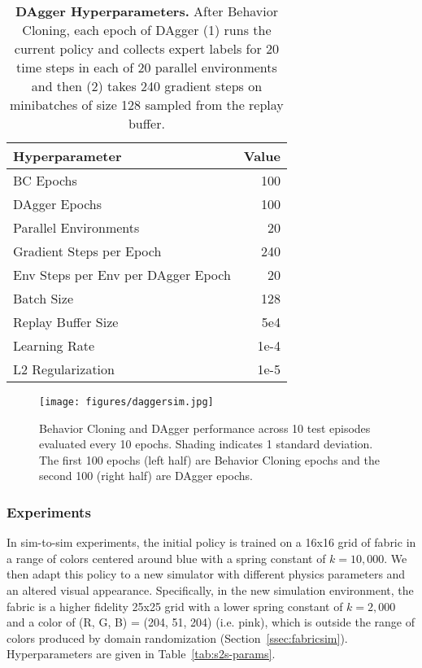 \begin{table}[!htbp]
\centering
{
 \begin{tabular}{l r} 
Hyperparameter & Value \\
\hline
BC Epochs & 100 \\
DAgger Epochs & 100 \\
Parallel Environments & 20 \\
Gradient Steps per Epoch & 240 \\
Env Steps per Env per DAgger Epoch & 20 \\
Batch Size & 128 \\
Replay Buffer Size & 5e4 \\
Learning Rate & 1e-4 \\
L2 Regularization & 1e-5 \\
\end{tabular}}
\caption{\textbf{DAgger Hyperparameters.} After Behavior Cloning, each epoch of DAgger (1) runs the current policy and collects expert labels for 20 time steps in each of 20 parallel environments and then (2) takes 240 gradient steps on minibatches of size 128 sampled from the replay buffer.}
\label{tab:dagger-params}
\end{table}

\begin{figure}[t]
\center
\texttt{[image: figures/daggersim.jpg]}
\caption{
Behavior Cloning and DAgger performance across 10 test episodes evaluated every 10 epochs. Shading indicates 1 standard deviation. The first 100 epochs (left half) are Behavior Cloning epochs and the second 100 (right half) are DAgger epochs.}
\label{fig:daggersim}
\end{figure}

\subsubsection{Experiments}
In sim-to-sim experiments, the initial policy is trained on a 16x16 grid of fabric in a range of colors centered around blue with a spring constant of $k=10,000$. We then adapt this policy to a new simulator with different physics parameters and an altered visual appearance. Specifically, in the new simulation environment, the fabric is a higher fidelity 25x25 grid with a lower spring constant of $k=2,000$ and a color of (R, G, B) = (204, 51, 204) (i.e. pink), which is outside the range of colors produced by domain randomization (Section~\ref{ssec:fabricsim}). Hyperparameters are given in Table~\ref{tab:s2s-params}.

